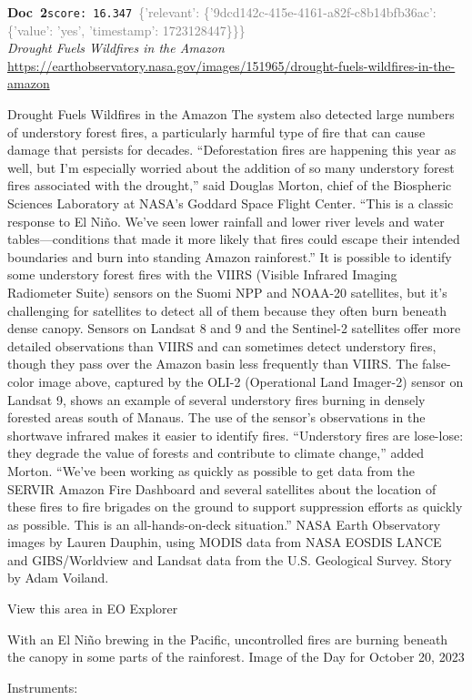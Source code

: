 \documentclass[a4paper,11pt]{article}
\begin{document}
\begin{docenv}
{\footnotesize\textcolor{doccolor}{\textbf{Doc~2}}}\hfill{\tiny\texttt{score:~16.347}}\ {\tiny\textcolor{gray}{\{'relevant': \{'9dcd142c-415e-4161-a82f-c8b14bfb36ac': \{'value': 'yes', 'timestamp': 1723128447\}\}\}}}\\[3pt]
{\small\textit{Drought Fuels Wildfires in the Amazon}}\\[2pt]
{\tiny\url{https://earthobservatory.nasa.gov/images/151965/drought-fuels-wildfires-in-the-amazon}}\\[4pt]
{\footnotesize Drought Fuels Wildfires in the Amazon
The system also detected large numbers of understory forest fires, a particularly harmful type of fire that can cause damage that persists for decades.
“Deforestation fires are happening this year as well, but I’m especially worried about the addition of so many understory forest fires associated with the drought,” said Douglas Morton, chief of the Biospheric Sciences Laboratory at NASA’s Goddard Space Flight Center. “This is a classic response to El Niño. We’ve seen lower rainfall and lower river levels and water tables—conditions that made it more likely that fires could escape their intended boundaries and burn into standing Amazon rainforest.”
It is possible to identify some understory forest fires with the VIIRS (Visible Infrared Imaging Radiometer Suite) sensors on the Suomi NPP and NOAA-20 satellites, but it’s challenging for satellites to detect all of them because they often burn beneath dense canopy. Sensors on Landsat 8 and 9 and the Sentinel-2 satellites offer more detailed observations than VIIRS and can sometimes detect understory fires, though they pass over the Amazon basin less frequently than VIIRS.
The false-color image above, captured by the OLI-2 (Operational Land Imager-2) sensor on Landsat 9, shows an example of several understory fires burning in densely forested areas south of Manaus. The use of the sensor’s observations in the shortwave infrared makes it easier to identify fires.
“Understory fires are lose-lose: they degrade the value of forests and contribute to climate change,” added Morton. “We’ve been working as quickly as possible to get data from the SERVIR Amazon Fire Dashboard and several satellites about the location of these fires to fire brigades on the ground to support suppression efforts as quickly as possible. This is an all-hands-on-deck situation.”
NASA Earth Observatory images by Lauren Dauphin, using MODIS data from NASA EOSDIS LANCE and GIBS/Worldview and Landsat data from the U.S. Geological Survey. Story by Adam Voiland.

View this area in EO Explorer

With an El Niño brewing in the Pacific, uncontrolled fires are burning beneath the canopy in some parts of the rainforest.
Image of the Day for October 20, 2023

Instruments:}
\end{docenv}
\end{document}
